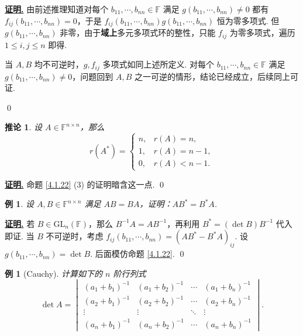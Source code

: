 \documentclass[10pt,openany]{article}
\theoremstyle{thmstyle} %
\theoremstyle{defstyle} %
\newtheorem{corollary}[theorem]{推论}
\theoremstyle{prostyle} %
\theoremstyle{exastyle}
\newtheorem{example}[theorem]{例}
\theoremstyle{remstyle}
\renewenvironment{proof}[1][证明]{\par\underline{\textbf{#1.}} \;\fangsong}{\qed\par}
\newcommand{\F}{\mathbb{F}}
\newcommand{\gfn}{\text{GL}_n(\mathbb{F})}
\newcommand{\n}{^{n \times n}}
\begin{document}
\begin{proof}
    由前述推理知道对每个 \( b_{11},\cdots,b_{nn} \in \F \) 满足 \( g(b_{11},\cdots,b_{nn}) \neq 0 \) 都有 \( f_{ij}(b_{11},\cdots,b_{nn})=0 \)，于是 \( f_{ij}(b_{11},\cdots,b_{nn})g(b_{11},\cdots,b_{nn}) \) 恒为零多项式. 但 \( g(b_{11},\cdots,b_{nn}) \) 非零，由于\textbf{域上}多元多项式环的整性，只能 \( f_{ij} \) 为零多项式，遍历 \( 1 \leq i,j \leq n \) 即得.
	
	当 \( A,B \) 均不可逆时，\( g, f_{ij} \) 多项式如同上述所定义. 对每个 \( b_{11},\cdots,b_{nn} \in \F \) 满足 \( g(b_{11},\cdots,b_{nn}) \neq 0 \)，问题回到 \( A,B \) 之一可逆的情形，结论已经成立，后续同上可证.
	
\end{proof}

\begin{corollary}
	设 \( A \in \F\n \)，那么
	\[ r(A^*)=\left\{ \begin{array}{ll}
		n, & r(A)=n, \\
		1, & r(A)=n-1, \\
		0, & r(A)<n-1.
	\end{array}\right. \]
\end{corollary}

\begin{proof}
	命题 \ref{4.1.22} (3) 的证明暗含这一点.
\end{proof}

\begin{example}
	设 \( A,B \in \F\n \) 满足 \( AB=BA \)，证明：\( AB^*=B^*A \).
\end{example}

\begin{proof}
	若 \( B \in \gfn \)，那么 \( B^{-1}A=AB^{-1} \)，再利用 \( B^*=(\det B) B^{-1} \) 代入即证. 当 \( B \) 不可逆时，考虑 \( f_{ij}(b_{11},\cdots,b_{nn})= (AB^*-B^*A)_{ij} \). 设 \( g(b_{11},\cdots,b_{nn})=\det B \). 后面模仿命题 \ref{4.1.22}.
\end{proof}


\begin{example}[Cauchy]
	计算如下的 \( n \) 阶行列式
	\[ \det A= \begin{vmatrix}
		(a_1+b_1)^{-1} & (a_1+b_2)^{-1} & \cdots & (a_1+b_n)^{-1} \\
		(a_2+b_1)^{-1} & (a_2+b_2)^{-1} & \cdots & (a_2+b_n)^{-1} \\
		\vdots & \vdots & \ddots & \vdots \\
		(a_n+b_1)^{-1} & (a_n+b_2)^{-1} & \cdots & (a_n+b_n)^{-1} 
	\end{vmatrix}. \]
\end{example}
\end{document}
